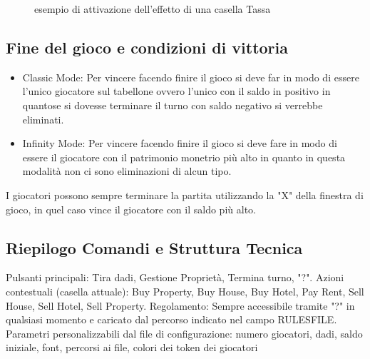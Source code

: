 \begin{figure}[H]
    \centering
    \caption{esempio di attivazione dell'effetto di una casella Tassa}
	\label{img:gamescreen}
\end{figure}
\subsection{Fine del gioco e condizioni di vittoria}
\begin{itemize}
    \item Classic Mode: Per vincere facendo finire il gioco si deve far in modo di essere l'unico giocatore sul tabellone ovvero l'unico con il saldo in positivo in quanto\newline se si dovesse terminare il turno con saldo negativo si verrebbe eliminati.
    \item Infinity Mode: Per vincere facendo finire il gioco si deve fare in modo di essere il giocatore con il patrimonio monetrio più alto in quanto in questa modalità non ci sono eliminazioni di alcun tipo.
\end{itemize}
I giocatori possono sempre terminare la partita utilizzando la "X" della finestra di gioco, in quel caso vince il giocatore con il saldo più alto.
\subsection{Riepilogo Comandi e Struttura Tecnica}
Pulsanti principali: Tira dadi, Gestione Proprietà, Termina turno, "?".
Azioni contestuali (casella attuale): Buy Property, Buy House, Buy Hotel, Pay Rent, Sell House, Sell Hotel, Sell Property.\newline 
Regolamento: Sempre accessibile tramite "?" in qualsiasi momento e caricato dal percorso indicato nel campo RULESFILE.\newline 
Parametri personalizzabili dal file di configurazione: numero giocatori, dadi, saldo iniziale, font, percorsi ai file, colori dei token dei giocatori
